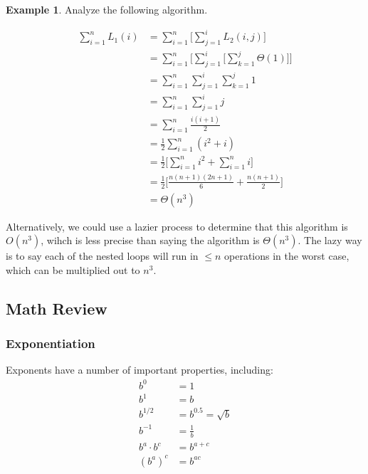 \documentclass[]{article}
\theoremstyle{definition}
\newtheorem{ex}{Example}[section]
\newcommand{\lecture}[1]{\marginpar{{\footnotesize $\leftarrow$ \underline{#1}}}}
\begin{document}
			\begin{ex}
				\lecture{January 17, 2013}
				Analyze the following algorithm.
				\begin{algorithm}
				\end{algorithm}

				\begin{align*}
					\sum_{i = 1}^{n} L_1(i) &= \sum_{i = 1}^{n} \bigg[\sum_{j = 1}^{i} L_2(i, j)\bigg] \\
					&= \sum_{i = 1}^{n} \bigg[ \sum_{j = 1}^{i} \bigg[ \sum_{k = 1}^{j} \Theta(1) \bigg] \bigg] \\
					&= \sum_{i = 1}^{n} \sum_{j = 1}^{i} \sum_{k = 1}^{j} 1 \\
					&= \sum_{i = 1}^{n} \sum_{j = 1}^{i} j \\
					&= \sum_{i = 1}^{n} \frac{i(i+1)}{2} \\
					&= \frac{1}{2} \sum_{i = 1}^{n}(i^2 + i) \\
					&= \frac{1}{2} \bigg[ \sum_{i = 1}^{n} i^2 + \sum_{i = 1}^{n} i \bigg] \\
					&= \frac{1}{2} \bigg[ \frac{n(n+1)(2n+1)}{6} + \frac{n(n+1)}{2} \bigg] \\
					&= \Theta(n^3)
				\end{align*}

				Alternatively, we could use a lazier process to determine that this algorithm is $O(n^3)$, wihch is less precise than saying the algorithm is $\Theta(n^3)$. The lazy way is to say each of the nested loops will run in $\le n$ operations in the worst case, which can be multiplied out to $n^3$.
			\end{ex}

		\subsection{Math Review}
			\subsubsection{Exponentiation}
				Exponents have a number of important properties, including:
				\begin{align*}
					b^0 &= 1 \\
					b^1 &= b \\
					b^{1/2} &= b^{0.5} = \sqrt{b} \\
					b^{-1} &= \frac{1}{b} \\
					b^a \cdot b^c &= b^{a + c} \\
					(b^a)^c &= b^{ac}
				\end{align*}
\end{document}
